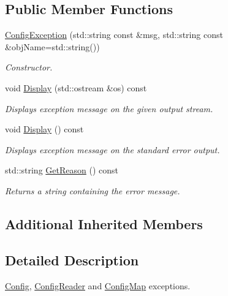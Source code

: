 \subsection*{Public Member Functions}
\begin{DoxyCompactItemize}
\item 
\hyperlink{class_common_1_1_config_exception_a3b6738ec7ab3614f5b2e0d61d9316014}{Config\-Exception} (std\-::string const \&msg, std\-::string const \&obj\-Name=std\-::string())
\begin{DoxyCompactList}\small\item\em Constructor. \end{DoxyCompactList}\item 
void \hyperlink{class_common_1_1_config_exception_ad4ee85d0f156157abdde32b4fbf23369}{Display} (std\-::ostream \&os) const 
\begin{DoxyCompactList}\small\item\em Displays exception message on the given output stream. \end{DoxyCompactList}\item 
\hypertarget{class_common_1_1_config_exception_a1a340225bc9583bb9794e5ea8730020a}{void \hyperlink{class_common_1_1_config_exception_a1a340225bc9583bb9794e5ea8730020a}{Display} () const }\label{class_common_1_1_config_exception_a1a340225bc9583bb9794e5ea8730020a}

\begin{DoxyCompactList}\small\item\em Displays exception message on the standard error output. \end{DoxyCompactList}\item 
std\-::string \hyperlink{class_common_1_1_config_exception_a95f96a5d70b3a4ab3aa82f934bf74a7f}{Get\-Reason} () const 
\begin{DoxyCompactList}\small\item\em Returns a string containing the error message. \end{DoxyCompactList}\end{DoxyCompactItemize}
\subsection*{Additional Inherited Members}


\subsection{Detailed Description}
\hyperlink{class_common_1_1_config}{Config}, \hyperlink{class_common_1_1_config_reader}{Config\-Reader} and \hyperlink{class_common_1_1_config_map}{Config\-Map} exceptions. 

